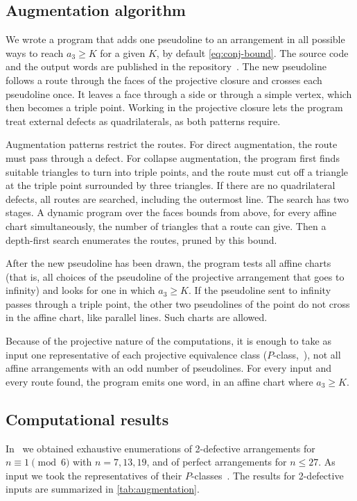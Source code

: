 \subsection{Augmentation algorithm}

We wrote a program that adds one pseudoline to an arrangement in all possible ways to reach $a_3\ge K$ for a given $K$, by default \eqref{eq:conj-bound}. The source code and the output words are published in the repository~\cite{nonsimple-arrangements}. The new pseudoline follows a route through the faces of the projective closure and crosses each pseudoline once. It leaves a face through a side or through a simple vertex, which then becomes a triple point.
Working in the projective closure lets the program treat external defects as quadrilaterals, as both patterns require.

Augmentation patterns restrict the routes. For direct augmentation, the route must pass through a defect. For collapse augmentation, the program first finds suitable triangles to turn into triple points, and the route must cut off a triangle at the triple point surrounded by three triangles. If there are no quadrilateral defects, all routes are searched, including the outermost line.
The search has two stages. A dynamic program over the faces bounds from above, for every affine chart simultaneously, the number of triangles that a route can give. Then a depth-first search enumerates the routes, pruned by this bound.

After the new pseudoline has been drawn, the program tests all affine charts (that is, all choices of the pseudoline of the projective arrangement that goes to infinity) and looks for one in which $a_3\ge K$.
If the pseudoline sent to infinity passes through a triple point, the other two pseudolines of the point do not cross in the affine chart, like parallel lines. Such charts are allowed.

Because of the projective nature of the computations, it is enough to take as input one representative of each projective equivalence class ($P$-class,~\cite[Definition~5.8]{pu26b}), not all affine arrangements with an odd number of pseudolines.
For every input and every route found, the program emits one word, in an affine chart where $a_3\ge K$.

\subsection{Computational results}

In~\cite{pu26b} we obtained exhaustive enumerations of 2-defective arrangements for $n\equiv1\pmod 6$ with $n=7,13,19$, and of perfect arrangements for $n\le27$. As input we took the representatives of their $P$-classes~\cite[Subsection~7.2]{pu26b}. The results for 2-defective inputs are summarized in \cref{tab:augmentation}.


